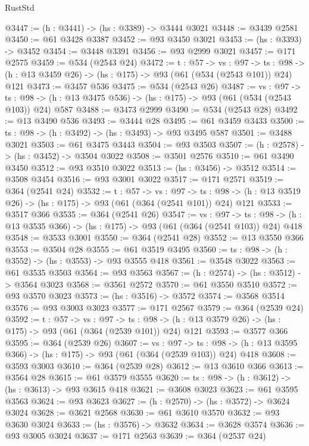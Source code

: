 \begin{lexlean}{RustStd}
\begin{coremodule}
@3447 := (h : @3441) -> (hs : @3389) -> @3444 @3021
@3448 := @3439 @2581
@3450 := @61 @3428 @3387
@3452 := @93 @3450 @3021
@3453 := (hs : @3393) -> @3452
@3454 := @3448 @3391
@3456 := @93 @2999 @3021
@3457 := @171 @2575
@3459 := @534 (@2543 @24)
@3472 := {t : @57} ->
  {vs : @97} ->
  {ts : @98} -> (h : @13 @3459 @26) -> (hs : @175) -> @93 (@61 (@534 (@2543 @101)) @24) @121
@3473 := @3457 @536
@3475 := @534 (@2543 @26)
@3487 := {vs : @97} ->
  {ts : @98} -> (h : @13 @3475 @536) -> (hs : @175) -> @93 (@61 (@534 (@2543 @103)) @24) @587
@3488 := @3473 @2999
@3490 := @534 (@2543 @28)
@3492 := @13 @3490 @536
@3493 := @3444 @28
@3495 := @61 @3459 @3433
@3500 := {ts : @98} -> (h : @3492) -> (hs : @3493) -> @93 @3495 @587
@3501 := @3488 @3021
@3503 := @61 @3475 @3443
@3504 := @93 @3503
@3507 := (h : @2578) -> (hs : @3452) -> @3504 @3022
@3508 := @3501 @2576
@3510 := @61 @3490 @3450
@3512 := @93 @3510 @3022
@3513 := (hs : @3456) -> @3512
@3514 := @3508 @3454
@3516 := @93 @3001 @3022
@3517 := @171 @2571
@3519 := @364 (@2541 @24)
@3532 := {t : @57} ->
  {vs : @97} ->
  {ts : @98} -> (h : @13 @3519 @26) -> (hs : @175) -> @93 (@61 (@364 (@2541 @101)) @24) @121
@3533 := @3517 @366
@3535 := @364 (@2541 @26)
@3547 := {vs : @97} ->
  {ts : @98} -> (h : @13 @3535 @366) -> (hs : @175) -> @93 (@61 (@364 (@2541 @103)) @24) @418
@3548 := @3533 @3001
@3550 := @364 (@2541 @28)
@3552 := @13 @3550 @366
@3553 := @3504 @28
@3555 := @61 @3519 @3495
@3560 := {ts : @98} -> (h : @3552) -> (hs : @3553) -> @93 @3555 @418
@3561 := @3548 @3022
@3563 := @61 @3535 @3503
@3564 := @93 @3563
@3567 := (h : @2574) -> (hs : @3512) -> @3564 @3023
@3568 := @3561 @2572
@3570 := @61 @3550 @3510
@3572 := @93 @3570 @3023
@3573 := (hs : @3516) -> @3572
@3574 := @3568 @3514
@3576 := @93 @3003 @3023
@3577 := @171 @2567
@3579 := @364 (@2539 @24)
@3592 := {t : @57} ->
  {vs : @97} ->
  {ts : @98} -> (h : @13 @3579 @26) -> (hs : @175) -> @93 (@61 (@364 (@2539 @101)) @24) @121
@3593 := @3577 @366
@3595 := @364 (@2539 @26)
@3607 := {vs : @97} ->
  {ts : @98} -> (h : @13 @3595 @366) -> (hs : @175) -> @93 (@61 (@364 (@2539 @103)) @24) @418
@3608 := @3593 @3003
@3610 := @364 (@2539 @28)
@3612 := @13 @3610 @366
@3613 := @3564 @28
@3615 := @61 @3579 @3555
@3620 := {ts : @98} -> (h : @3612) -> (hs : @3613) -> @93 @3615 @418
@3621 := @3608 @3023
@3623 := @61 @3595 @3563
@3624 := @93 @3623
@3627 := (h : @2570) -> (hs : @3572) -> @3624 @3024
@3628 := @3621 @2568
@3630 := @61 @3610 @3570
@3632 := @93 @3630 @3024
@3633 := (hs : @3576) -> @3632
@3634 := @3628 @3574
@3636 := @93 @3005 @3024
@3637 := @171 @2563
@3639 := @364 (@2537 @24)

\end{coremodule}
\end{lexlean}
